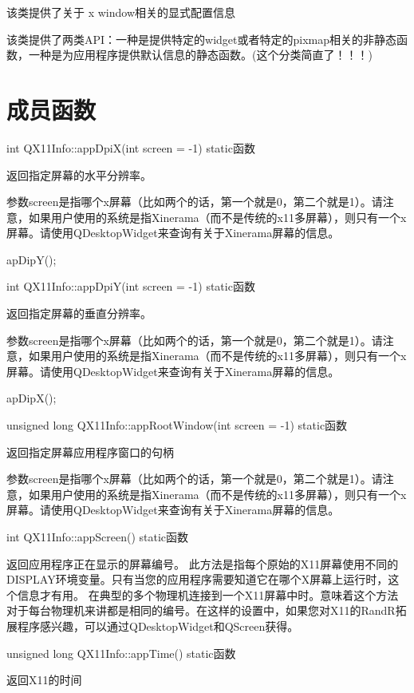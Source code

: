 该类提供了关于 x window相关的显式配置信息

该类提供了两类API：一种是提供特定的widget或者特定的pixmap相关的非静态函数，一种是为应用程序提供默认信息的静态函数。(这个分类简直了！！！)

\section{成员函数}

int QX11Info::appDpiX(int screen = -1) static函数

返回指定屏幕的水平分辨率。

参数screen是指哪个x屏幕（比如两个的话，第一个就是0，第二个就是1）。请注意，如果用户使用的系统是指Xinerama（而不是传统的x11多屏幕），则只有一个x屏幕。请使用QDesktopWidget来查询有关于Xinerama屏幕的信息。

\begin{notice}[另请参阅]
apDipY();
\end{notice}

int QX11Info::appDpiY(int screen = -1) static函数

返回指定屏幕的垂直分辨率。

参数screen是指哪个x屏幕（比如两个的话，第一个就是0，第二个就是1）。请注意，如果用户使用的系统是指Xinerama（而不是传统的x11多屏幕），则只有一个x屏幕。请使用QDesktopWidget来查询有关于Xinerama屏幕的信息。

\begin{notice}[另请参阅]
apDipX();
\end{notice}

unsigned long QX11Info::appRootWindow(int screen = -1) static函数

返回指定屏幕应用程序窗口的句柄

参数screen是指哪个x屏幕（比如两个的话，第一个就是0，第二个就是1）。请注意，如果用户使用的系统是指Xinerama（而不是传统的x11多屏幕），则只有一个x屏幕。请使用QDesktopWidget来查询有关于Xinerama屏幕的信息。

int QX11Info::appScreen() static函数

返回应用程序正在显示的屏幕编号。 此方法是指每个原始的X11屏幕使用不同的DISPLAY环境变量。只有当您的应用程序需要知道它在哪个X屏幕上运行时，这个信息才有用。 在典型的多个物理机连接到一个X11屏幕中时。意味着这个方法对于每台物理机来讲都是相同的编号。在这样的设置中，如果您对X11的RandR拓展程序感兴趣，可以通过QDesktopWidget和QScreen获得。

unsigned long QX11Info::appTime() static函数

返回X11的时间

